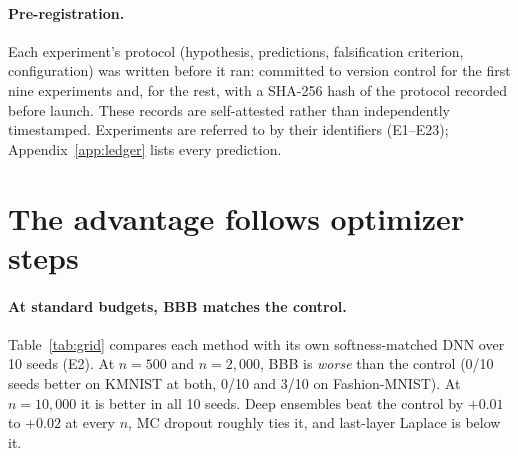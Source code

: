 \documentclass[10pt]{article}
\begin{document}
\paragraph{Pre-registration.} Each experiment's protocol (hypothesis,
predictions, falsification criterion, configuration) was written before it
ran: committed to version control for the first nine experiments and, for
the rest, with a SHA-256 hash of the protocol recorded before launch. These
records are self-attested rather than independently timestamped. Experiments
are referred to by their identifiers (E1--E23); Appendix~\ref{app:ledger}
lists every prediction.

\section{The advantage follows optimizer steps}\label{sec:control}
\paragraph{At standard budgets, BBB matches the control.} Table~\ref{tab:grid}
compares each method with its own softness-matched DNN over 10 seeds (E2).
At $n=500$ and $n=2{,}000$, BBB is \emph{worse} than the control (0/10 seeds
better on KMNIST at both, 0/10 and 3/10 on Fashion-MNIST). At $n=10{,}000$ it is
better in all 10 seeds. Deep ensembles beat the control by $+0.01$ to $+0.02$
at every $n$, MC dropout roughly ties it, and last-layer Laplace is below it.
\end{document}
